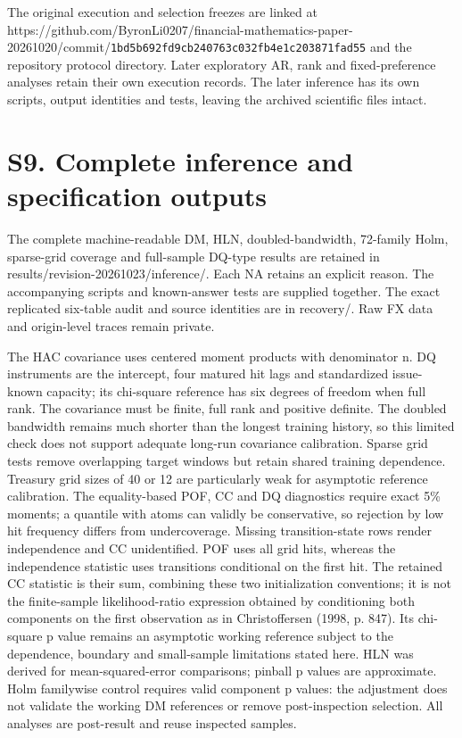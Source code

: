 \documentclass[11pt,a4paper]{article}
\begin{document}
The original execution and selection freezes are linked at https://github.com/ByronLi0207/financial-mathematics-paper-20261020/commit/\texttt{1bd5b692fd9cb240}\allowbreak\texttt{763c032fb4e1c203}\allowbreak\texttt{871fad55} and the repository protocol directory. Later exploratory AR, rank and fixed-preference analyses retain their own execution records. The later inference has its own scripts, output identities and tests, leaving the archived scientific files intact.

\section*{S9. Complete inference and specification outputs}
The complete machine-readable DM, HLN, doubled-bandwidth, 72-family Holm, sparse-grid coverage and full-sample DQ-type results are retained in results/revision-20261023/inference/. Each NA retains an explicit reason. The accompanying scripts and known-answer tests are supplied together. The exact replicated six-table audit and source identities are in recovery/. Raw FX data and origin-level traces remain private.

The HAC covariance uses centered moment products with denominator n. DQ instruments are the intercept, four matured hit lags and standardized issue-known capacity; its chi-square reference has six degrees of freedom when full rank. The covariance must be finite, full rank and positive definite. The doubled bandwidth remains much shorter than the longest training history, so this limited check does not support adequate long-run covariance calibration. Sparse grid tests remove overlapping target windows but retain shared training dependence. Treasury grid sizes of 40 or 12 are particularly weak for asymptotic reference calibration. The equality-based POF, CC and DQ diagnostics require exact 5\% moments; a quantile with atoms can validly be conservative, so rejection by low hit frequency differs from undercoverage. Missing transition-state rows render independence and CC unidentified. POF uses all grid hits, whereas the independence statistic uses transitions conditional on the first hit. The retained CC statistic is their sum, combining these two initialization conventions; it is not the finite-sample likelihood-ratio expression obtained by conditioning both components on the first observation as in Christoffersen (1998, p. 847). Its chi-square p value remains an asymptotic working reference subject to the dependence, boundary and small-sample limitations stated here. HLN was derived for mean-squared-error comparisons; pinball p values are approximate. Holm familywise control requires valid component p values: the adjustment does not validate the working DM references or remove post-inspection selection. All analyses are post-result and reuse inspected samples.
\end{document}
